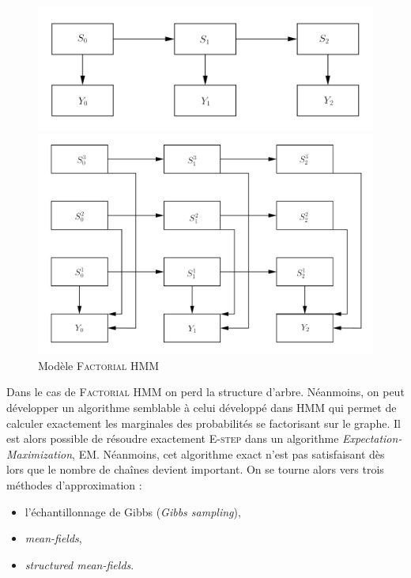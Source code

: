 \documentclass[10pt,a4paper]{article}
\newcommand{\hmm}{\textsc{HMM}}
\newcommand{\fhmm}{\textsc{Factorial HMM}}
\newcommand{\Estep}{\textsc{E-step}}
\newcommand{\EM}{\textsc{EM}}
\begin{document}
\begin{figure}[H]
  \centering
  \begin{minipage}{.46\linewidth}
    \centering
      \includegraphics[scale=0.2]{../resources/pictures/graph1.png}
      \caption{Modèle \hmm}
  \end{minipage}
  \begin{minipage}{.46\linewidth}
    \centering
      \includegraphics[scale=0.2]{../resources/pictures/graph2.png}
      \caption{Modèle \fhmm}
  \end{minipage}
\end{figure}

Dans le cas de \fhmm{} on perd la structure d'arbre.
Néanmoins, on peut développer un algorithme semblable à celui développé dans 
\hmm{} qui permet de calculer exactement les marginales des probabilités se 
factorisant sur le graphe.
Il est alors possible de résoudre exactement \Estep{} dans un algorithme 
\emph{Expectation-Maximization}, \EM. Néanmoins, cet algorithme exact n'est pas 
satisfaisant dès lors que le nombre de chaînes devient important.
On se tourne alors vers trois méthodes d'approximation :
\begin{itemize}
  \item l'échantillonnage de Gibbs (\emph{Gibbs sampling}),
  \item \textit{mean-fields},
  \item \textit{structured mean-fields}.
\end{itemize}
\end{document}
